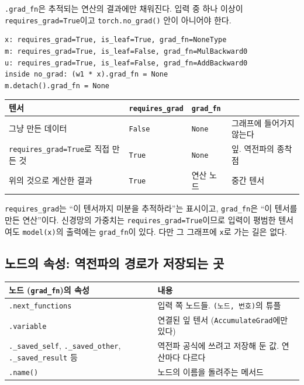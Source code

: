 \documentclass[11pt,a4paper]{article}
\begin{document}
\texttt{.grad\_fn}은 추적되는 연산의 결과에만 채워진다.
입력 중 하나 이상이 \texttt{requires\_grad=True}이고 \texttt{torch.no\_grad()} 안이 아니어야 한다.
\begin{lstlisting}[language={},numbers=none]
x: requires_grad=True, is_leaf=True, grad_fn=NoneType
m: requires_grad=True, is_leaf=False, grad_fn=MulBackward0
u: requires_grad=True, is_leaf=False, grad_fn=AddBackward0
inside no_grad: (w1 * x).grad_fn = None
m.detach().grad_fn = None
\end{lstlisting}
\begin{center}
\begin{tabular}{@{}>{\raggedright\arraybackslash}p{48mm}lll@{}}
\toprule
텐서 & \texttt{requires\_grad} & \texttt{grad\_fn} & \\
\midrule
그냥 만든 데이터 & \texttt{False} & \texttt{None} & 그래프에 들어가지 않는다 \\
\texttt{requires\_grad=True}로 직접 만든 것 & \texttt{True} & \texttt{None} & 잎. 역전파의 종착점 \\
위의 것으로 계산한 결과 & \texttt{True} & 연산 노드 & 중간 텐서 \\
\bottomrule
\end{tabular}
\end{center}
\texttt{requires\_grad}는 ``이 텐서까지 미분을 추적하라''는 표시이고, \texttt{grad\_fn}은 ``이 텐서를 만든 연산''이다.
신경망의 가중치는 \texttt{requires\_grad=True}이므로 입력이 평범한 텐서여도 \texttt{model(x)}의 출력에는 \texttt{grad\_fn}이 있다. 다만 그 그래프에 \texttt{x}로 가는 길은 없다.

\subsection{노드의 속성: 역전파의 경로가 저장되는 곳}

\begin{center}
\begin{tabular}{@{}p{50mm}p{104mm}@{}}
\toprule
노드 (\texttt{grad\_fn})의 속성 & 내용 \\
\midrule
\texttt{.next\_functions} & 입력 쪽 노드들. \texttt{(노드, 번호)}의 튜플 \\
\texttt{.variable} & 연결된 잎 텐서 (\texttt{AccumulateGrad}에만 있다) \\
\texttt{.\_saved\_self}, \texttt{.\_saved\_other}, \texttt{.\_saved\_result} 등 & 역전파 공식에 쓰려고 저장해 둔 값. 연산마다 다르다 \\
\texttt{.name()} & 노드의 이름을 돌려주는 메서드 \\
\bottomrule
\end{tabular}
\end{center}
\end{document}
